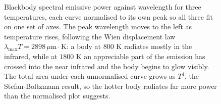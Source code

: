 \begin{figure}[htbp]
\caption[Blackbody spectral emissive power]{Blackbody spectral emissive
power against wavelength for three temperatures, each curve normalised to
its own peak so all three fit on one set of axes. The peak wavelength
moves to the left as temperature rises, following the Wien displacement
law $\lambda_{\max}T = 2898\,\mu\mathrm{m\cdot K}$: a body at $800$ K
radiates mostly in the infrared, while at $1800$ K an appreciable part of
the emission has crossed into the near infrared and the body begins to
glow visibly. The total area under each unnormalised curve grows as
$T^4$, the Stefan-Boltzmann result, so the hotter body radiates far more
power than the normalised plot suggests.}
\label{fig:vol04ch05:blackbody-spectrum}
\end{figure}

